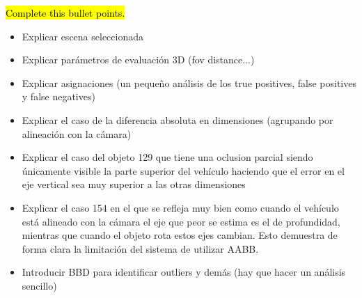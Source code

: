 \hl{Complete this bullet points.}
\begin{itemize}
    \item Explicar escena seleccionada
    \item Explicar parámetros de evaluación 3D (fov distance...)
    \item Explicar asignaciones (un pequeño análisis de los true positives, false positives y false negatives)
    \item Explicar el caso de la diferencia absoluta en dimensiones (agrupando por alineación con la cámara)
    \item Explicar el caso del objeto 129 que tiene una oclusion parcial siendo únicamente visible la parte superior del vehículo haciendo que el error en el eje vertical sea muy superior a las otras dimensiones
    \item Explicar el caso 154 en el que se refleja muy bien como cuando el vehículo está alineado con la cámara el eje que peor se estima es el de profundidad, mientras que cuando el objeto rota estos ejes cambian. Esto demuestra de forma clara la limitación del sistema de utilizar AABB.
    \item Introducir BBD para identificar outliers y demás (hay que hacer un análisis sencillo)
\end{itemize}




